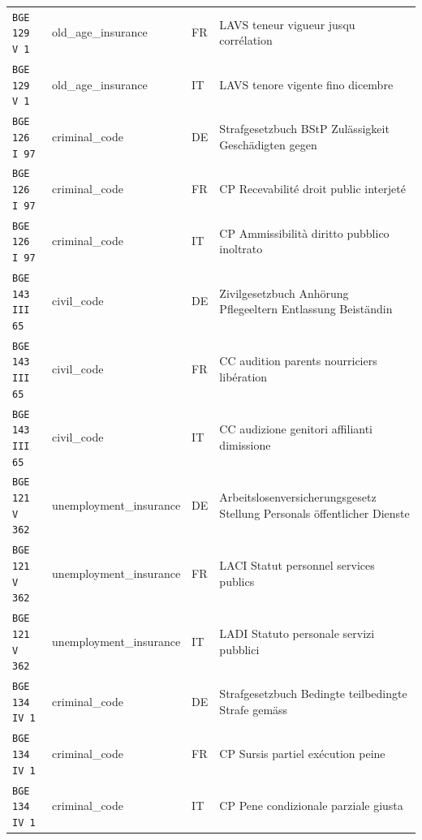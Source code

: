 \begin{table}[h]
\begin{tabular}{>{\raggedright\arraybackslash}p{2.2cm} >{\raggedright\arraybackslash}p{3.55cm} >{\raggedright\arraybackslash}p{0.8cm} >{\raggedright\arraybackslash}p{8.05cm}}
\texttt{BGE 129 V 1} & old\_age\_insurance & FR & LAVS teneur vigueur jusqu corrélation \\
\texttt{BGE 129 V 1} & old\_age\_insurance & IT & LAVS tenore vigente fino dicembre \\
\texttt{BGE 126 I 97} & criminal\_code & DE & Strafgesetzbuch BStP Zulässigkeit Geschädigten gegen \\
\texttt{BGE 126 I 97} & criminal\_code & FR & CP Recevabilité droit public interjeté \\
\texttt{BGE 126 I 97} & criminal\_code & IT & CP Ammissibilità diritto pubblico inoltrato \\
\texttt{BGE 143 III 65} & civil\_code & DE & Zivilgesetzbuch Anhörung Pflegeeltern Entlassung Beiständin \\
\texttt{BGE 143 III 65} & civil\_code & FR & CC audition parents nourriciers libération \\
\texttt{BGE 143 III 65} & civil\_code & IT & CC audizione genitori affilianti dimissione \\
\texttt{BGE 121 V 362} & unemployment\_insurance & DE & Arbeitslosenversicherungsgesetz Stellung Personals öffentlicher Dienste \\
\texttt{BGE 121 V 362} & unemployment\_insurance & FR & LACI Statut personnel services publics \\
\texttt{BGE 121 V 362} & unemployment\_insurance & IT & LADI Statuto personale servizi pubblici \\
\texttt{BGE 134 IV 1} & criminal\_code & DE & Strafgesetzbuch Bedingte teilbedingte Strafe gemäss \\
\texttt{BGE 134 IV 1} & criminal\_code & FR & CP Sursis partiel exécution peine \\
\texttt{BGE 134 IV 1} & criminal\_code & IT & CP Pene condizionale parziale giusta \\
\bottomrule
\end{tabular}
\end{table}
\clearpage
